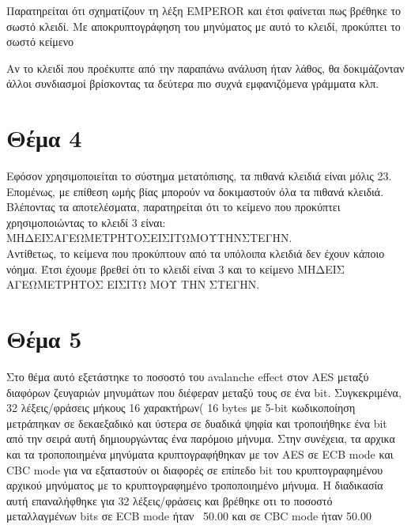 \documentclass[a4paper, 11pt]{article}
\newcommand{\lt}{\latintext}
\begin{document}
Παρατηρείται ότι σχηματίζουν τη λέξη {\lt EMPEROR} και έτσι φαίνεται πως βρέθηκε το σωστό κλειδί. Με αποκρυπτογράφηση του
μηνύματος με αυτό το κλειδί, προκύπτει το σωστό κείμενο

Αν το κλειδί που προέκυπτε από την παραπάνω ανάλυση ήταν λάθος, θα δοκιμάζονταν άλλοι συνδιασμοί βρίσκοντας τα δεύτερα πιο συχνά εμφανιζόμενα γράμματα κλπ.




\newpage


\section*{Θέμα 4}
Εφόσον χρησιμοποιείται το σύστημα μετατόπισης, τα πιθανά κλειδιά είναι μόλις 23. Επομένως, με επίθεση ωμής βίας μπορούν να
δοκιμαστούν όλα τα πιθανά κλειδιά. Βλέποντας τα αποτελέσματα, παρατηρείται ότι το κείμενο που προκύπτει χρησιμοποιώντας το κλειδί 3 είναι:\\
ΜΗΔΕΙΣΑΓΕΩΜΕΤΡΗΤΟΣΕΙΣΙΤΩΜΟΥΤΗΝΣΤΕΓΗΝ.\\
Αντίθετως, το κείμενα που προκύπτουν από τα υπόλοιπα κλειδιά δεν έχουν κάποιο νόημα. Έτσι έχουμε βρεθεί ότι
το κλειδί είναι 3 και το κείμενο ΜΗΔΕΙΣ ΑΓΕΩΜΕΤΡΗΤΟΣ ΕΙΣΙΤΩ ΜΟΥ ΤΗΝ ΣΤΕΓΗΝ.









\newpage


\section*{Θέμα 5}
Στο θέμα αυτό εξετάστηκε το ποσοστό του {\lt avalanche effect} στον {\lt AES} μεταξύ διαφόρων ζευγαριών μηνυμάτων που διέφεραν μεταξύ τους σε ένα {\lt bit}. Συγκεκριμένα, 32 λέξεις/φράσεις μήκους 16 χαρακτήρων( 16 {\lt bytes} με 5-{\lt bit} κωδικοποίηση μετράπηκαν σε δεκαεξαδικό και ύστερα σε δυαδικά ψηφία και τροποιήθηκε ένα {\lt bit} από την σειρά αυτή δημιουργώντας ένα παρόμοιο μήνυμα. Στην συνέχεια, τα αρχικα και τα τροποποιημένα μηνύματα κρυπτογραφήθηκαν με τον {\lt AES} σε {\lt ECB mode} και {\lt CBC mode} για να εξαταστούν οι διαφορές σε επίπεδο {\lt bit} του κρυπτογραφημένου αρχικού μηνύματος με το κρυπτογραφημένο τροποποιημένο μήνυμα. Η διαδικασία αυτή επαναλήφθηκε για 32 λέξεις/φράσεις και βρέθηκε οτι το ποσοστό μεταλλαγμένων bits σε {\lt ECB mode} ήταν ~50.00 και σε {\lt CBC mode} ήταν 50.00%
\end{document}
